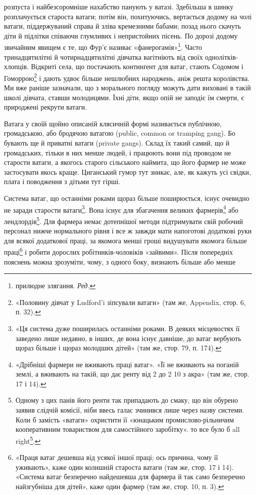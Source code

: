 \parcont{}  %
розпуста і найбезсоромніше нахабство панують у ватазі. Здебільша
в шинку розплачується староста ватаги; потім він, похитуючись,
вертається додому на чолі ватаги, піддержуваний справа
й зліва кремезними бабами; позад нього скачуть діти й підлітки
співаючи глумливих і непристойних пісень. По дорозі додому звичайним
явищем є те, що Фур’є називає «фанерогамія»\footnote*{
прилюдне злягання. \emph{Ред.}
}. Часто тринадцятилітні
й чотирнадцятилітні дівчатка вагітніють від своїх
однолітків-хлопців. Відкриті села, що постачають континґент
для ватаг, стають Содомом і Гоморрою\footnote{
«Половину дівчат у Ludford’i зіпсували ватаги» (там же, Appendix,
стор. 6, п. 32).
} і дають удвоє більше
нешлюбних народжень, аніж решта королівства. Ми вже раніше
зазначали, що з морального погляду можуть дати виховані в
такій школі дівчата, ставши молодицями. Їхні діти, якщо опій
не заподіє їм смерти, є природжені рекрути ватаги.

Ватага у своїй щойно описаній клясичній формі називається
публічною, громадською, або бродячою ватагою (public, common
or tramping gang). Бо бувають ще й приватні ватаги (private
gangs). Склад їх такий самий, що й громадських, тільки в них
менше людей, і працюють вони під проводом не старости ватаги,
а якогось старого сільського наймита, що його фармер не може
застосувати якось краще. Циганський гумор тут зникає, але, як
кажуть усі свідки, плата і поводження з дітьми тут гірші.

Система ватаг, що останніми роками щораз більше поширюється,
існує очевидно не заради старости ватаги\footnote{
«Ця система дуже поширилась останніми роками. В деяких місцевостях
її заведено лише недавно, в інших, де вона існує давніше, до ватаг
вербують щораз більше і щораз молодших дітей» (там же, стор. 79,
п. 174).
}. Вона існує
для збагачення великих фармерів\footnote{
«Дрібніші фармери не вживають праці ватаг». «Її не вживають
на поганій землі, а вживають на такій, що дає ренту від 2
до 2 10 з акра» (там же, стор. 17 і 14).
} або лендлордів\footnote{
Одному з цих панів його ренти так припадають до смаку, що він
обурено заявив слідчій комісії, ніби ввесь галас зчинився лише через
назву системи. Коли б замість «ватаги» охристити її «юнацьким промислово-рільничим
кооперативним товариством для самостійного заробітку».
то все було б all right\footnote*{
гаразд. \emph{Ред.}
}.
}. Для фармера
немає дотепнішої методи підтримувати свій робочий персонал
нижче нормального рівня і все ж завжди мати напоготові
додаткові руки для всякої додаткової праці, за якомога менші
гроші видушувати якомога більше праці\footnote{
«Праця ватаг дешевша від усякої іншої праці; ось причина, чому
її уживають», каже один колишній староста ватаги (там же, стор. 17
і 14). «Система ватаг безперечно найдешевша для фармера й так само
безперечно найзгубніша для дітей», каже один фармер (там же, стор. 10,
п. 3).
} і робити дорослих
робітників-чоловіків «зайвими». Після попередніх пояснень
можна зрозуміти, чому, з одного боку, визнають більше або менше
\parbreak{}  %
